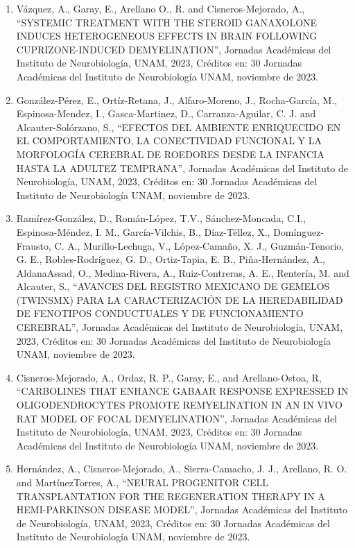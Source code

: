 \begin{enumerate}
\item Vázquez, A., Garay, E., Arellano O., R. and Cisneros-Mejorado, A., “SYSTEMIC TREATMENT WITH THE STEROID GANAXOLONE INDUCES HETEROGENEOUS EFFECTS IN BRAIN 
FOLLOWING CUPRIZONE-INDUCED DEMYELINATION”, Jornadas Académicas del Instituto de Neurobiología, UNAM, 2023, Créditos en: 30 Jornadas Académicas del Instituto de 
Neurobiología UNAM, noviembre de 2023.

\item González-Pérez, E., Ortíz-Retana, J., Alfaro-Moreno, J., Rocha-García, M., Espinosa-Mendez, I., Gasca-Martinez, D., Carranza-Aguilar, C. J. and 
Alcauter-Solórzano, S., “EFECTOS DEL AMBIENTE ENRIQUECIDO EN EL COMPORTAMIENTO, LA CONECTIVIDAD FUNCIONAL Y LA MORFOLOGÍA CEREBRAL DE ROEDORES DESDE LA INFANCIA 
HASTA LA ADULTEZ TEMPRANA”, Jornadas Académicas del Instituto de Neurobiología, UNAM, 2023, Créditos en: 30 Jornadas Académicas del Instituto de Neurobiología 
UNAM, noviembre de 2023.

\item Ramírez-González, D., Román-López, T.V., Sánchez-Moncada, C.I., Espinosa-Méndez, I. M., García-Vilchis, B., Díaz-Téllez, X., Domínguez-Frausto, C. A., 
Murillo-Lechuga, V., López-Camaño, X. J., Guzmán-Tenorio, G. E., Robles-Rodríguez, G. D., Ortiz-Tapia, E. B., Piña-Hernández, A., AldanaAssad, O., Medina-Rivera, 
A., Ruiz-Contreras, A. E., Rentería, M. and Alcauter, S., “AVANCES DEL REGISTRO MEXICANO DE GEMELOS (TWINSMX) PARA LA CARACTERIZACIÓN DE LA HEREDABILIDAD DE 
FENOTIPOS CONDUCTUALES Y DE FUNCIONAMIENTO CEREBRAL”, Jornadas Académicas del Instituto de Neurobiología, UNAM, 2023, Créditos en: 30 Jornadas Académicas del 
Instituto de Neurobiología UNAM, noviembre de 2023.

\item Cisneros-Mejorado, A., Ordaz, R. P., Garay, E., and Arellano-Ostoa, R, “CARBOLINES THAT ENHANCE GABAAR RESPONSE EXPRESSED IN OLIGODENDROCYTES PROMOTE 
REMYELINATION IN AN IN VIVO RAT MODEL OF FOCAL DEMYELINATION”, Jornadas Académicas del Instituto de Neurobiología, UNAM, 2023, Créditos en: 30 Jornadas 
Académicas del Instituto de Neurobiología UNAM, noviembre de 2023.

\item Hernández, A., Cisneros-Mejorado, A., Sierra-Camacho, J. J., Arellano, R. O. and MartínezTorres, A., “NEURAL PROGENITOR CELL TRANSPLANTATION FOR THE 
REGENERATION 
THERAPY IN A HEMI-PARKINSON DISEASE MODEL”, Jornadas Académicas del Instituto de Neurobiología, UNAM, 2023, Créditos en: 30 Jornadas Académicas del Instituto de 
Neurobiología UNAM, noviembre de 2023.


\end{enumerate}

